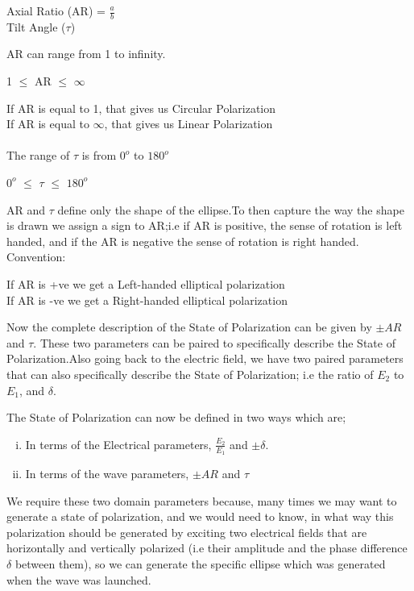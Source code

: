 \begin{center}
Axial Ratio (AR) = $\frac{a}{b}$\\
Tilt Angle ($\tau$)
\end{center}
AR can range from 1 to infinity.\begin{center}
1 $\leq $ AR $\leq $ $\infty $
\end{center}
If AR is equal to 1, that gives us Circular Polarization\\
If AR is equal to $\infty$, that gives us Linear Polarization\\
\\
The range of $\tau $ is from $0^{o}$ to $180^{o}$ 
\begin{center}
$0^{o}$ $\leq $ $\tau $ $\leq $ $180^{o} $
\end{center}
AR and $\tau $ define only the shape of the ellipse.To then capture the way the shape is drawn we assign a sign to AR;i.e if AR is positive, the sense of rotation is left handed, and if the AR is negative the sense of rotation is right handed.\\
Convention:
\begin{center}
If AR is +ve we get a Left-handed elliptical polarization\\
If AR is -ve we get a Right-handed elliptical polarization
\end{center}
Now the complete description of the State of Polarization can be given by $\pm AR$ and $\tau $. These two parameters can be paired to specifically describe the State of Polarization.Also going back to the electric field, we have two paired parameters that can also specifically describe the State of Polarization; i.e the ratio of $ E_2 $ to $ E_1 $, and $\delta$.

The State of Polarization can now be defined in two ways which are;
\begin{enumerate}[(i)]
\item In terms of the Electrical parameters, $\frac{E_2}{E_1}$ and $\pm \delta $.
\item In terms of the wave parameters, $\pm AR $ and $\tau $
\end{enumerate}
We require these two domain parameters because, many times we may want to generate a state of polarization, and we would need to know, in what way this polarization should be generated by exciting two electrical fields that are horizontally and vertically polarized (i.e their amplitude and the phase difference $\delta $ between them), so we can generate the specific ellipse which was generated when the wave was launched.

